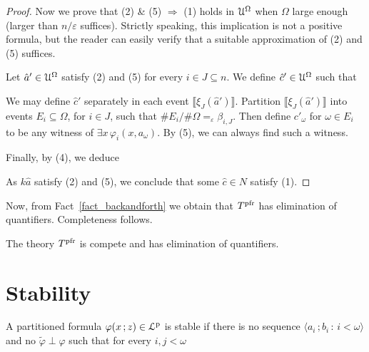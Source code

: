 \documentclass[10pt,oneside]{amsproc}
\begin{document}
{\begin{proof}
  Now we prove that (2) \& (5) $\Rightarrow$ (1) holds in ${\EuScript U}^\Omega$ when $\Omega$ large enough (larger than $n/\varepsilon$ suffices).
  Strictly speaking, this implication is not a positive formula, but the reader can easily verify that a suitable approximation of (2) and (5) suffices. 
  
  Let $\hat a'\in{\EuScript U}^\Omega$ satisfy (2) and (5) for every $i\in J\subseteq n$. 
  We define $\hat c'\in{\EuScript U}^\Omega$ such that 
  
  
  We may define $\hat c'$ separately in each event $\llbracket\xi_J(\hat a')\rrbracket$.
  Partition $\llbracket\xi_J(\hat a')\rrbracket$ into events $E_i\subseteq\Omega$, for $i\in J$, such that $\# E_i/\#\Omega=_\varepsilon\beta_{i,J}$.
  Then define $c'_\omega$ for $\omega\in E_i$ to be any witness of $\exists x\,\varphi_i(x,a_\omega)$.
  By (5), we can always find such a witness.
  
  Finally, by (4), we deduce


  As $k\hat a$ satisfy (2) and (5), we conclude that some $\hat c\in N$ satisfy (1).
\end{proof}

Now, from Fact~\ref{fact_backandforth} we obtain that $T^{\rm pfr}$ has elimination of quantifiers.
Completeness follows.

\begin{corollary}
  The theory  $T^{\rm pfr}$ is compete and has elimination of quantifiers.
\end{corollary}
\section{Stability}

A partitioned formula $\varphi(x\,;z)\in{\EuScript L}^{\rm p}$ is stable if there is no sequence $\langle a_i\,;b_i\,:\,i<\omega\rangle$ and no $\tilde\varphi\perp\varphi$ such that for every $i,j<\omega$


}
\end{document}
